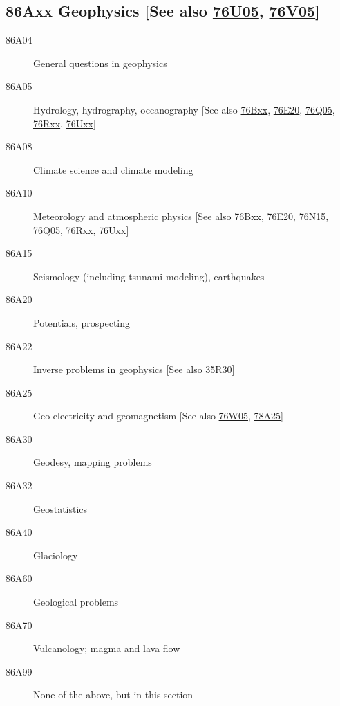\subsection*{86Axx  Geophysics [See also \hyperref[76U05]{76U05}, \hyperref[76V05]{76V05}] }\label{86Axx}
\begin{description}  
\item [86A04]\label{86A04} General questions in geophysics
\item [86A05]\label{86A05} Hydrology, hydrography, oceanography [See also \hyperref[76Bxx]{76Bxx}, \hyperref[76E20]{76E20}, \hyperref[76Q05]{76Q05}, \hyperref[76Rxx]{76Rxx}, \hyperref[76Uxx]{76Uxx}]
\item [86A08]\label{86A08} Climate science and climate modeling
\item [86A10]\label{86A10} Meteorology and atmospheric physics [See also \hyperref[76Bxx]{76Bxx}, \hyperref[76E20]{76E20}, \hyperref[76N15]{76N15}, \hyperref[76Q05]{76Q05}, \hyperref[76Rxx]{76Rxx}, \hyperref[76Uxx]{76Uxx}]
\item [86A15]\label{86A15} Seismology (including tsunami modeling), earthquakes
\item [86A20]\label{86A20} Potentials, prospecting
\item [86A22]\label{86A22} Inverse problems in geophysics [See also \hyperref[35R30]{35R30}]
\item [86A25]\label{86A25} Geo-electricity and geomagnetism [See also \hyperref[76W05]{76W05}, \hyperref[78A25]{78A25}]
\item [86A30]\label{86A30} Geodesy, mapping problems
\item [86A32]\label{86A32} Geostatistics
\item [86A40]\label{86A40} Glaciology
\item [86A60]\label{86A60} Geological problems
\item [86A70]\label{86A70} Vulcanology; magma and lava flow
\item [86A99]\label{86A99} None of the above, but in this section
\end{description}
